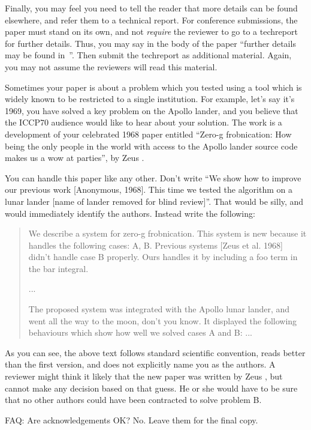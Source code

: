 \documentclass[10pt,twocolumn,letterpaper]{article}
\begin{document}
Finally, you may feel you need to tell the reader that more details can be
found elsewhere, and refer them to a technical report.  For conference
submissions, the paper must stand on its own, and not {\em require} the
reviewer to go to a techreport for further details.  Thus, you may say in
the body of the paper ``further details may be found
in~\cite{Authors06b}''.  Then submit the techreport as additional material.
Again, you may not assume the reviewers will read this material.

Sometimes your paper is about a problem which you tested using a tool which
is widely known to be restricted to a single institution.  For example,
let's say it's 1969, you have solved a key problem on the Apollo lander,
and you believe that the ICCP70 audience would like to hear about your
solution.  The work is a development of your celebrated 1968 paper entitled
``Zero-g frobnication: How being the only people in the world with access to
the Apollo lander source code makes us a wow at parties'', by Zeus \etal.

You can handle this paper like any other.  Don't write ``We show how to
improve our previous work [Anonymous, 1968].  This time we tested the
algorithm on a lunar lander [name of lander removed for blind review]''.
That would be silly, and would immediately identify the authors. Instead
write the following:
\begin{quotation}
\noindent
   We describe a system for zero-g frobnication.  This
   system is new because it handles the following cases:
   A, B.  Previous systems [Zeus et al. 1968] didn't
   handle case B properly.  Ours handles it by including
   a foo term in the bar integral.

   ...

   The proposed system was integrated with the Apollo
   lunar lander, and went all the way to the moon, don't
   you know.  It displayed the following behaviours
   which show how well we solved cases A and B: ...
\end{quotation}
As you can see, the above text follows standard scientific convention,
reads better than the first version, and does not explicitly name you as
the authors.  A reviewer might think it likely that the new paper was
written by Zeus \etal, but cannot make any decision based on that guess.
He or she would have to be sure that no other authors could have been
contracted to solve problem B.

FAQ: Are acknowledgements OK?  No.  Leave them for the final copy.
\end{document}
